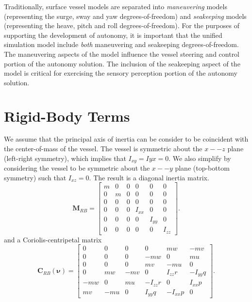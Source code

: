 \documentclass[11pt, letterpaper]{article}
\begin{document}
Traditionally, surface vessel models are separated into \emph{maneuvering} models (representing the surge, sway and yaw degrees-of-freedom) and \emph{seakeeping} models (representing the heave, pitch and roll degrees-of-freedom). For the purposes of supporting the development of autonomy, it is important that the unified simulation model include \emph{both} maneuvering and seakeeping degrees-of-freedom. The maneuvering aspects of the model influence the vessel steering and control portion of the autonomy solution. The inclusion of the seakeeping aspect of the model is critical for exercising the sensory perception portion of the autonomy solution.

\section{Rigid-Body Terms}

We assume that the principal axis of inertia can be consider to be coincident with the center-of-mass of the vessel.  The vessel is symmetric about the $x--z$ plane (left-right symmetry), which implies that $I_{xy}=I{yx}=0$.  We also simplify by considering the vessel to be symmetric about the $x--y$ plane (top-bottom symmetry) such that $I_{xz}=0$.  The result is a diagonal inertia matrix.
\begin{equation}
\bm{M}_{RB}= \left[ 
\begin{array}{ccccccc}
m & 0 & 0 & 0 & 0 & 0 \\
0 & m & 0 & 0 & 0 & 0 \\
0 & 0 & 0 & 0 & 0 & 0 \\
0 & 0 & 0 & I_{xx} & 0 & 0 \\
0 & 0 & 0 & 0 & I_{yy} & 0 \\
0 & 0 & 0 & 0 & 0 & I_{zz} 
\end{array} \right].
\end{equation}
and a Coriolis-centripetal matrix
\begin{equation}
\bm{C}_{RB}(\bm{\nu})= \left[ 
\begin{array}{ccccccc}
  0 & 0 & 0 & 0 & mw & -mv \\
  0 & 0 & 0 & -mw & 0 & mu \\
  0 & 0 & 0 & mv & -mu & 0 \\
  0 & mw  & -mv & 0 & I_{zz}r & -I_{yy}q \\
  -mw & 0 & mu & -I_{zz}r & 0 & I_{xx}p \\
  mv & -mu & 0 & I_{yy}q & -I_{xx}p  & 0
\end{array} \right].
\end{equation}
\end{document}
